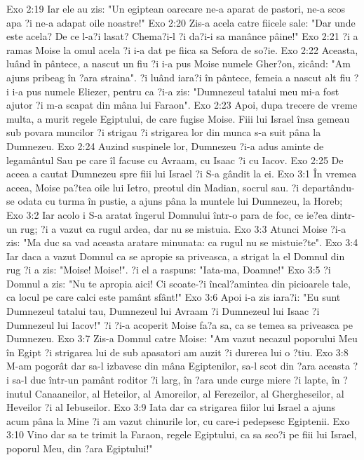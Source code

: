 Exo 2:19  Iar ele au zis: "Un egiptean oarecare ne-a aparat de pastori, ne-a scos apa ?i ne-a adapat oile noastre!"
Exo 2:20  Zis-a acela catre fiicele sale: "Dar unde este acela? De ce l-a?i lasat? Chema?i-l ?i da?i-i sa manânce pâine!"
Exo 2:21  ?i a ramas Moise la omul acela ?i i-a dat pe fiica sa Sefora de so?ie.
Exo 2:22  Aceasta, luând în pântece, a nascut un fiu ?i i-a pus Moise numele Gher?on, zicând: "Am ajuns pribeag în ?ara straina". ?i luând iara?i în pântece, femeia a nascut alt fiu ?i i-a pus numele Eliezer, pentru ca ?i-a zis: "Dumnezeul tatalui meu mi-a fost ajutor ?i m-a scapat din mâna lui Faraon".
Exo 2:23  Apoi, dupa trecere de vreme multa, a murit regele Egiptului, de care fugise Moise. Fiii lui Israel însa gemeau sub povara muncilor ?i strigau ?i strigarea lor din munca s-a suit pâna la Dumnezeu.
Exo 2:24  Auzind suspinele lor, Dumnezeu ?i-a adus aminte de legamântul Sau pe care îl facuse cu Avraam, cu Isaac ?i cu Iacov.
Exo 2:25  De aceea a cautat Dumnezeu spre fiii lui Israel ?i S-a gândit la ei.
Exo 3:1  În vremea aceea, Moise pa?tea oile lui Ietro, preotul din Madian, socrul sau. ?i departându-se odata cu turma în pustie, a ajuns pâna la muntele lui Dumnezeu, la Horeb;
Exo 3:2  Iar acolo i S-a aratat îngerul Domnului într-o para de foc, ce ie?ea dintr-un rug; ?i a vazut ca rugul ardea, dar nu se mistuia.
Exo 3:3  Atunci Moise ?i-a zis: "Ma duc sa vad aceasta aratare minunata: ca rugul nu se mistuie?te".
Exo 3:4  Iar daca a vazut Domnul ca se apropie sa priveasca, a strigat la el Domnul din rug ?i a zis: "Moise! Moise!". ?i el a raspuns: "Iata-ma, Doamne!"
Exo 3:5  ?i Domnul a zis: "Nu te apropia aici! Ci scoate-?i încal?amintea din picioarele tale, ca locul pe care calci este pamânt sfânt!"
Exo 3:6  Apoi i-a zis iara?i: "Eu sunt Dumnezeul tatalui tau, Dumnezeul lui Avraam ?i Dumnezeul lui Isaac ?i Dumnezeul lui Iacov!" ?i ?i-a acoperit Moise fa?a sa, ca se temea sa priveasca pe Dumnezeu.
Exo 3:7  Zis-a Domnul catre Moise: "Am vazut necazul poporului Meu în Egipt ?i strigarea lui de sub apasatori am auzit ?i durerea lui o ?tiu.
Exo 3:8  M-am pogorât dar sa-l izbavesc din mâna Egiptenilor, sa-l scot din ?ara aceasta ?i sa-l duc într-un pamânt roditor ?i larg, în ?ara unde curge miere ?i lapte, în ?inutul Canaaneilor, al Heteilor, al Amoreilor, al Ferezeilor, al Ghergheseilor, al Heveilor ?i al Iebuseilor.
Exo 3:9  Iata dar ca strigarea fiilor lui Israel a ajuns acum pâna la Mine ?i am vazut chinurile lor, cu care-i pedepsesc Egiptenii.
Exo 3:10  Vino dar sa te trimit la Faraon, regele Egiptului, ca sa sco?i pe fiii lui Israel, poporul Meu, din ?ara Egiptului!"
